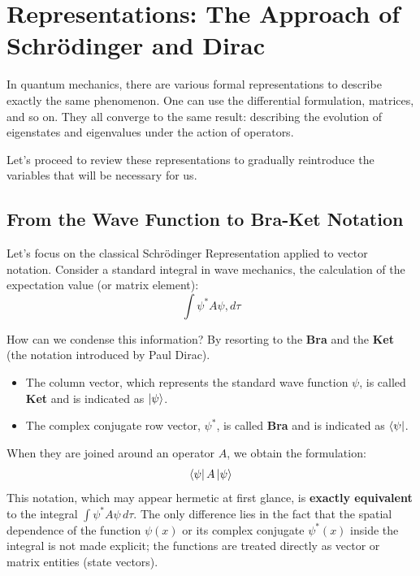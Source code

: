 \section{Representations: The Approach of Schrödinger and Dirac}

In quantum mechanics, there are various formal representations to describe exactly the same phenomenon. One can use the differential formulation, matrices, and so on. They all converge to the same result: describing the evolution of eigenstates and eigenvalues under the action of operators.

Let's proceed to review these representations to gradually reintroduce the variables that will be necessary for us.

\subsection{From the Wave Function to Bra-Ket Notation}

Let's focus on the classical Schrödinger Representation applied to vector notation.
Consider a standard integral in wave mechanics, the calculation of the expectation value (or matrix element):
\begin{equation}
\int \psi^* A \psi , d\tau
\end{equation}

How can we condense this information? By resorting to the \textbf{Bra} and the \textbf{Ket} (the notation introduced by Paul Dirac).
\begin{itemize}
\item The column vector, which represents the standard wave function $\psi$, is called \textbf{Ket} and is indicated as $\ket{\psi}$.
\item The complex conjugate row vector, $\psi^*$, is called \textbf{Bra} and is indicated as $\bra{\psi}$.
\end{itemize}

When they are joined around an operator $A$, we obtain the formulation:
\begin{equation}
\bra{\psi} A \ket{\psi}
\end{equation}
This notation, which may appear hermetic at first glance, is \textbf{exactly equivalent} to the integral $\int \psi^* A \psi \, d\tau$. The only difference lies in the fact that the spatial dependence of the function $\psi(x)$ or its complex conjugate $\psi^*(x)$ inside the integral is not made explicit; the functions are treated directly as vector or matrix entities (state vectors).

